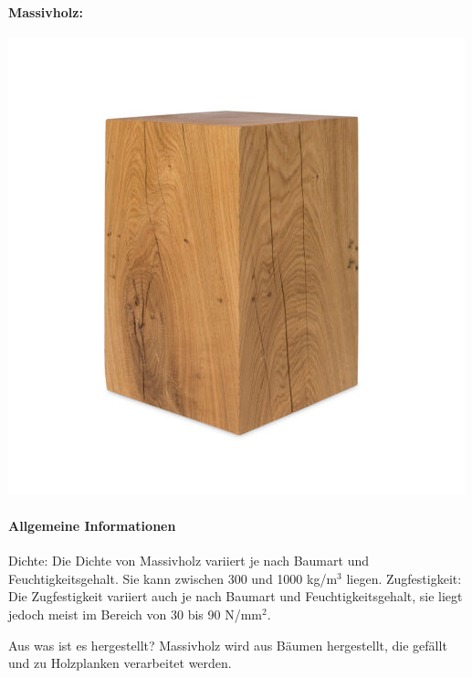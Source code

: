 \documentclass{article}
\begin{document}
\clearpage

\newpage
\pagestyle{fancy}
\fancyhf{}

\begin{multicols}{3}

\paragraph{Massivholz:}
\includegraphics[width=\linewidth]{Holz.jpg}

\paragraph{Allgemeine Informationen}
Dichte: Die Dichte von Massivholz variiert
je nach Baumart und Feuchtigkeitsgehalt. Sie kann zwischen 300 und 1000
kg/m$^3$ liegen. Zugfestigkeit: Die Zugfestigkeit variiert auch je nach Baumart
und Feuchtigkeitsgehalt, sie liegt jedoch meist im Bereich von 30 bis 90
N/mm$^2$.

Aus was ist es hergestellt? Massivholz wird aus Bäumen hergestellt, die gefällt
und zu Holzplanken verarbeitet werden.


\end{multicols}
\end{document}
